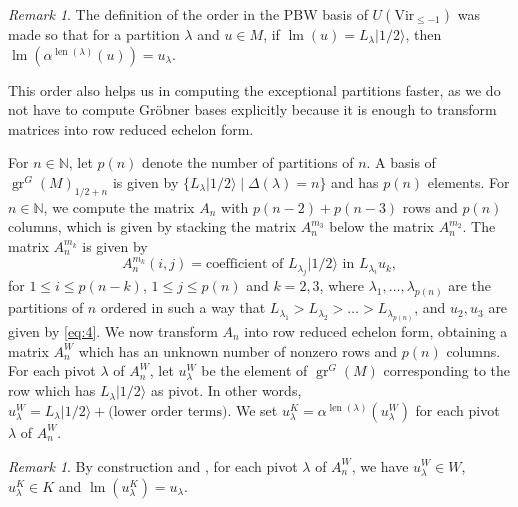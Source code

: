 \documentclass[a4paper, 12pt, reqno]{amsart}
\theoremstyle{remark}
\newtheorem{remark}[theorem]{Remark}
\DeclareMathOperator{\gr}{gr}
\DeclareMathOperator{\lm}{lm}
\DeclareMathOperator{\len}{len}
\newcommand{\vachalf}{{|1/2\rangle}}
\newcommand{\Vir}{{\mathrm{Vir}}}
\begin{document}
\begin{remark}
  \label{rmk:6}
  The definition of the order in the PBW basis of $U(\Vir_{\le -1})$ was made so that for a partition $\lambda$ and $u \in M$, if $\lm(u) = L_{\lambda}\vachalf$, then $\lm(\alpha^{\len(\lambda)}(u)) = u_{\lambda}$.

  This order also helps us in computing the exceptional partitions faster, as we do not have to compute Gröbner bases explicitly because it is enough to transform matrices into row reduced echelon form.
\end{remark}

For $n \in \mathbb{N}$, let $p(n)$ denote the number of partitions of $n$.
A basis of $\gr^G(M)_{1/2 + n}$ is given by $\{L_{\lambda}\vachalf \mid \Delta(\lambda) = n\}$ and has $p(n)$ elements.
For $n \in \mathbb{N}$, we compute the matrix $A_n$ with $p(n - 2) + p(n - 3)$ rows and $p(n)$ columns, which is given by stacking the matrix $A^{m_3}_n$ below the matrix $A^{m_2}_n$.
The matrix $A^{m_k}_n$ is given by
\begin{equation*}
  A^{m_k}_n(i, j) = \text{coefficient of $L_{\lambda_j}\vachalf$ in $L_{\lambda_i}u_k$},
\end{equation*}
for $1 \le i \le p(n - k)$, $1 \le j \le p(n)$ and $k = 2, 3$, where $\lambda_1, \dots, \lambda_{p(n)}$ are the partitions of $n$ ordered in such a way that $L_{\lambda_1} > L_{\lambda_2} > \dots > L_{\lambda_{p(n)}}$, and $u_2, u_3$ are given by \eqref{eq:4}.
We now transform $A_n$ into row reduced echelon form, obtaining a matrix $A^W_n$ which has an unknown number of nonzero rows and $p(n)$ columns.
For each pivot $\lambda$ of $A^W_n$, let $u^W_{\lambda}$ be the element of $\gr^G(M)$ corresponding to the row which has $L_{\lambda}\vachalf$ as pivot.
In other words, $u^W_{\lambda} = L_{\lambda}\vachalf + \text{(lower order terms)}$.
We set $u^K_{\lambda} = \alpha^{\len(\lambda)}(u^W_{\lambda})$ for each pivot $\lambda$ of $A^W_n$.

\begin{remark}
  \label{rmk:7}
  By construction and , for each pivot $\lambda$ of $A^W_n$, we have $u^W_{\lambda} \in W$, $u^K_{\lambda} \in K$ and $\lm(u^K_{\lambda}) = u_{\lambda}$.
\end{remark}
\end{document}
